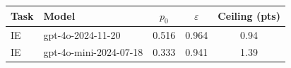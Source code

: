\begin{tabular}{@{}ll ccc@{}}
\toprule
Task & Model & $p_0$ & $\varepsilon$ & Ceiling (pts) \\
\midrule
IE & gpt-4o-2024-11-20 & 0.516 & 0.964 & 0.94 \\
IE & gpt-4o-mini-2024-07-18 & 0.333 & 0.941 & 1.39 \\
\bottomrule
\end{tabular}
